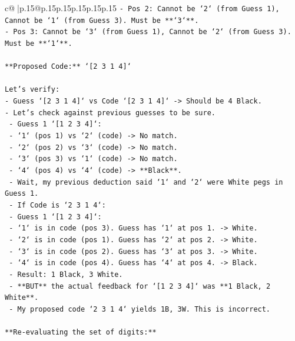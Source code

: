 \documentclass{article}
\begin{document}
{\begin{supertabular}{c@{$\;$}|p{.15\linewidth}@{}p{.15\linewidth}p{.15\linewidth}p{.15\linewidth}p{.15\linewidth}p{.15\linewidth}}
{{{\texttt{{-} Pos 2: Cannot be `2` (from Guess 1), Cannot be `1` (from Guess 3). Must be **`3`**.} \\
\texttt{{-} Pos 3: Cannot be `3` (from Guess 1), Cannot be `2` (from Guess 3). Must be **`1`**.} \\
\\ 
\texttt{**Proposed Code:** `{[}2 3 1 4{]}`} \\
\\ 
\texttt{Let's verify:} \\
\texttt{{-} Guess `{[}2 3 1 4{]}` vs Code `{[}2 3 1 4{]}` {-}> Should be 4 Black.} \\
\texttt{{-} Let's check against previous guesses to be sure.} \\
\texttt{    {-} Guess 1 `{[}1 2 3 4{]}`:} \\
\texttt{        {-} `1` (pos 1) vs `2` (code) {-}> No match.} \\
\texttt{        {-} `2` (pos 2) vs `3` (code) {-}> No match.} \\
\texttt{        {-} `3` (pos 3) vs `1` (code) {-}> No match.} \\
\texttt{        {-} `4` (pos 4) vs `4` (code) {-}> **Black**.} \\
\texttt{        {-} Wait, my previous deduction said `1` and `2` were White pegs in Guess 1.} \\
\texttt{        {-} If Code is `2 3 1 4`:} \\
\texttt{            {-} Guess 1 `{[}1 2 3 4{]}`:} \\
\texttt{                {-} `1` is in code (pos 3). Guess has `1` at pos 1. {-}> White.} \\
\texttt{                {-} `2` is in code (pos 1). Guess has `2` at pos 2. {-}> White.} \\
\texttt{                {-} `3` is in code (pos 2). Guess has `3` at pos 3. {-}> White.} \\
\texttt{                {-} `4` is in code (pos 4). Guess has `4` at pos 4. {-}> Black.} \\
\texttt{                {-} Result: 1 Black, 3 White.} \\
\texttt{            {-} **BUT** the actual feedback for `{[}1 2 3 4{]}` was **1 Black, 2 White**.} \\
\texttt{            {-} My proposed code `2 3 1 4` yields 1B, 3W. This is incorrect.} \\
\\ 
\texttt{**Re{-}evaluating the set of digits:**} \\
}}}
\end{supertabular}}
\end{document}
